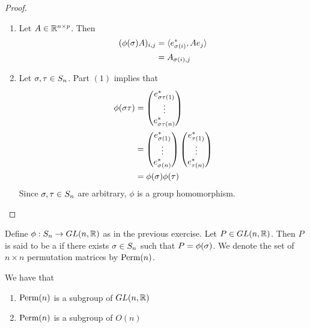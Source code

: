 \documentclass{book}
\begin{document}
	\begin{proof}
		\begin{enumerate}
			\item Let  $A \in \mathbb{R}^{n \times p}$. Then 
			\begin{align*}
				(\phi(\sigma) A)_{i,j}
				& = \langle e_{\sigma(i)}^*, A e_j \rangle \\
				& = A_{\sigma(i), j}
			\end{align*}
			\item Let $\sigma, \tau \in S_n$. Part $(1)$ implies that 
			\begin{align*}
				\phi(\sigma \tau)
				& = 
				\begin{pmatrix}
					e_{\sigma \tau (1)}^* \\
					\vdots \\
					e_{\sigma \tau (n)}^*
				\end{pmatrix} \\
				& = \begin{pmatrix}
					e_{\sigma (1)}^* \\
					\vdots \\
					e_{\sigma (n)}^*
				\end{pmatrix} 
				\begin{pmatrix}
					e_{\tau (1)}^* \\
					\vdots \\
					e_{\tau (n)}^*
				\end{pmatrix} \\
				& = \phi(\sigma) \phi(\tau)
			\end{align*}
			Since $\sigma, \tau \in S_n$ are arbitrary, $\phi$ is a group homomorphism. 
		\end{enumerate}
	\end{proof}
	
	
	\begin{defn} 
		Define $\phi: S_n \rightarrow GL(n, \mathbb{R})$ as in the previous exercise. Let $P \in GL(n, \mathbb{R})$. Then $P$ is said to be a  if there exists $\sigma \in S_n$ such that $P = \phi(\sigma)$. We denote the set of $n \times n$ permutation matrices by $\text{Perm}(n)$.
	\end{defn}

	\begin{ex} 
		We have that
		\begin{enumerate} 
			\item $\text{Perm}(n)$ is a subgroup of $GL(n, \mathbb{R})$
			\item $\text{Perm}(n)$ is a subgroup of $O(n)$
		\end{enumerate}
	\end{ex}
\end{document}
